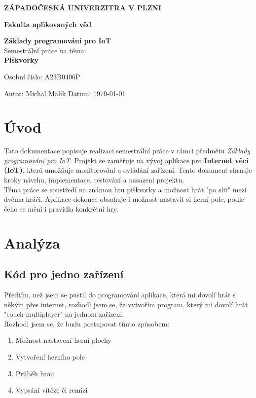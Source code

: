 \documentclass[a4paper,12pt]{article}
\begin{document}
\begin{titlepage}

    \centering

    {\Large \textbf{{ZÁPADOČESKÁ UNIVERZITRA V PLZNI}\\[0.5cm]}}

    \large \textbf{{Fakulta aplikovaných věd}\\[7cm]}

    \large \textbf{{Základy programování pro IoT}}\\[0.7cm]

    \large {Semestrální práce na téma:}\\[0.5cm]

    \large \textbf{{Piškvorky}}\\[6cm]

    \begin{flushleft}
    \large Osobní číslo: A23B0406P
    \end{flushleft}
    \begin{flushleft}
        \large Autor: Michal Malík \hfill Datum: \today \\
    \end{flushleft}

\end{titlepage}
\newpage

\tableofcontents
\newpage

\section{Úvod}
Tato dokumentace popisuje realizaci semestrální práce v rámci předmětu \textit{Základy programování pro IoT}. Projekt se zaměřuje na vývoj aplikace pro \textbf{Internet věcí (IoT)}, která umožňuje monitorování a ovládání zařízení. Tento dokument shrnuje kroky návrhu, implementace, testování a nasazení projektu.\\
Téma práce se soustředí na známou hru piškvorky a možnost hrát "po síti" mezi dvěma hráči. Aplikace dokonce obsahuje i možnost nastavit si herní pole, podle čeho se mění i pravidla konkrétní hry.


\section{Analýza}
\subsection{Kód pro jedno zařízení}
Předtím, než jsem se pustil do programování aplikace, která mi dovolí hrát s někým přes internet, rozhodl jsem se, že vytvořím program, který mi dovolí hrát "couch-multiplayer" na jednom zařízení. \\
Rozhodl jsem se, že budu postupovat tímto způsobem:
\begin{enumerate}
	\item Možnost nastavení herní plochy
	\item Vytvoření herního pole
	\item Průběh hrou
	\item Vypsání vítěze či remízi
\end{enumerate}
\end{document}
